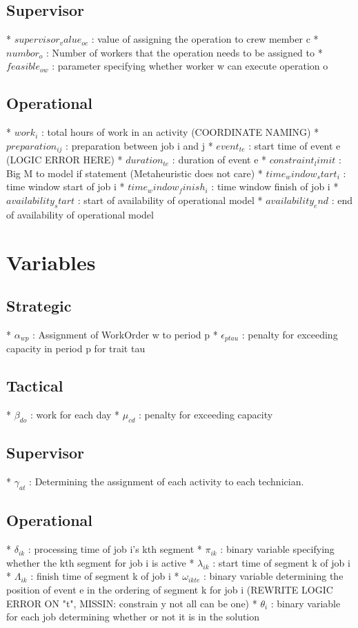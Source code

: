 \subsection{Supervisor}
* $supervisor_value_{oc}$    : value of assigning the operation to crew member c
* $numbor_{o}$               : Number of workers that the operation needs to be assigned to
* $feasible_{ow}$            : parameter specifying whether worker w can execute operation o
\subsection{Operational}
* $work_i$                   : total hours of work in an activity (COORDINATE NAMING)
* $preparation_{ij}$         : preparation between job i and j
* $event_{te}$               : start time of event e (LOGIC ERROR HERE)
* $duration_{te}$            : duration of event e
* $constraint_limit$         : Big M to model if statement (Metaheuristic does not care)
* $time_window_start_i$      : time window start of job i
* $time_window_finish_i$     : time window finish of job i
* $availability_start$       : start of availability of operational model
* $availability_end$         : end of availability of operational model

\section{Variables}

\subsection{Strategic}
* $\alpha_{wp}$              : Assignment of WorkOrder w to period p
* $\epsilon_{ptau}$          : penalty for exceeding capacity in period p for trait tau
\subsection{Tactical}
* $\beta_{do}$               : work for each day
* $\mu_{cd}$                 : penalty for exceeding capacity
\subsection{Supervisor}
* $\gamma_{at}$              : Determining the assignment of each activity to each technician.
\subsection{Operational}
* $\delta_{ik}$              : processing time of job i's kth segment
* $\pi_{ik}$                 : binary variable specifying whether the kth segment for job i is active
* $\lambda_{ik}$             : start time of segment k of job i
* $\Lambda_{ik}$             : finish time of segment k  of job i
* $\omega_{ikte}$            : binary variable determining the position of event e in the ordering of segment k for job i (REWRITE LOGIC ERROR ON "t", MISSIN: constrain y not all can be one)
* $\theta_i$                 : binary variable for each job determining whether or not it is in the solution

